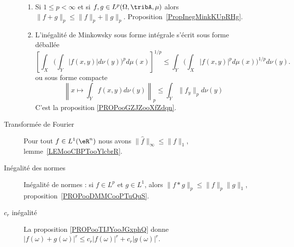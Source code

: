 \begin{description}
\begin{enumerate}
			\item
			      Si \( 1\leq p<\infty\) et si \( f,g\in L^p(\Omega,\tribA,\mu)\) alors \(  \| f+g \|_p\leq \| f \|_p+\| g \|_p\). Proposition~\ref{PropInegMinkKUpRHg}.
			\item
			      L'inégalité de Minkowsky sous forme intégrale s'écrit sous forme déballée
			      \begin{equation*}
				      \left[ \int_X\Big( \int_Y| f(x,y) |d\nu(y) \Big)^pd\mu(x) \right]^{1/p}\leq \int_Y\Big( \int_X| f(x,y) |^pd\mu(x) \Big)^{1/p}d\nu(y).
			      \end{equation*}
			      ou sous forme compacte
			      \begin{equation*}
				      \left\|   x\mapsto\int_Y f(x,y)d\nu(y)   \right\|_p\leq \int_Y  \| f_y \|_pd\nu(y)
			      \end{equation*}
			      C'est la proposition \ref{PROPooGZJZooXfZdqn}.
		\end{enumerate}
	\item[Transformée de Fourier]
		Pour tout \( f\in L^1(\eR^n)\) nous avons \( \| \hat f \|_{\infty}\leq \| f \|_1\), lemme~\ref{LEMooCBPTooYlcbrR}.
	\item[Inégalité des normes]
		Inégalité de normes : si \( f\in L^p\) et \( g\in L^1\), alors \( \| f*g \|_p\leq \| f \|_p\| g \|_1\), proposition~\ref{PROPooDMMCooPTuQuS}.
	\item[\( c_r\) inégalité] La proposition \ref{PROPooTIJYooJGxphQ} donne \( \big|  f(\omega)+g(\omega)  \big|^r\leq  c_r| f(\omega) |^r+c_r| g(\omega) |^r \).
\end{description}
